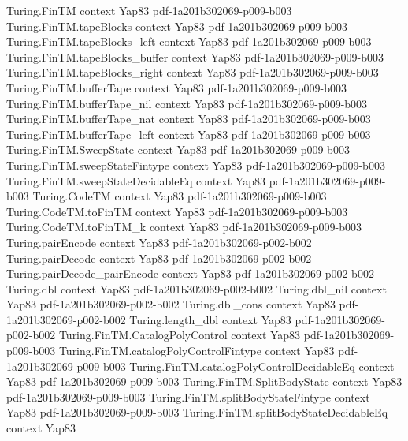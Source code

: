 \begin{theorem}
\proofstep
  {Turing.FinTM}
  {context}
  {Yap83}
  {pdf-1a201b302069-p009-b003}
\proofstep
  {Turing.FinTM.tapeBlocks}
  {context}
  {Yap83}
  {pdf-1a201b302069-p009-b003}
\proofstep
  {Turing.FinTM.tapeBlocks_left}
  {context}
  {Yap83}
  {pdf-1a201b302069-p009-b003}
\proofstep
  {Turing.FinTM.tapeBlocks_buffer}
  {context}
  {Yap83}
  {pdf-1a201b302069-p009-b003}
\proofstep
  {Turing.FinTM.tapeBlocks_right}
  {context}
  {Yap83}
  {pdf-1a201b302069-p009-b003}
\proofstep
  {Turing.FinTM.bufferTape}
  {context}
  {Yap83}
  {pdf-1a201b302069-p009-b003}
\proofstep
  {Turing.FinTM.bufferTape_nil}
  {context}
  {Yap83}
  {pdf-1a201b302069-p009-b003}
\proofstep
  {Turing.FinTM.bufferTape_nat}
  {context}
  {Yap83}
  {pdf-1a201b302069-p009-b003}
\proofstep
  {Turing.FinTM.bufferTape_left}
  {context}
  {Yap83}
  {pdf-1a201b302069-p009-b003}
\proofstep
  {Turing.FinTM.SweepState}
  {context}
  {Yap83}
  {pdf-1a201b302069-p009-b003}
\proofstep
  {Turing.FinTM.sweepStateFintype}
  {context}
  {Yap83}
  {pdf-1a201b302069-p009-b003}
\proofstep
  {Turing.FinTM.sweepStateDecidableEq}
  {context}
  {Yap83}
  {pdf-1a201b302069-p009-b003}
\proofstep
  {Turing.CodeTM}
  {context}
  {Yap83}
  {pdf-1a201b302069-p009-b003}
\proofstep
  {Turing.CodeTM.toFinTM}
  {context}
  {Yap83}
  {pdf-1a201b302069-p009-b003}
\proofstep
  {Turing.CodeTM.toFinTM_k}
  {context}
  {Yap83}
  {pdf-1a201b302069-p009-b003}
\proofstep
  {Turing.pairEncode}
  {context}
  {Yap83}
  {pdf-1a201b302069-p002-b002}
\proofstep
  {Turing.pairDecode}
  {context}
  {Yap83}
  {pdf-1a201b302069-p002-b002}
\proofstep
  {Turing.pairDecode_pairEncode}
  {context}
  {Yap83}
  {pdf-1a201b302069-p002-b002}
\proofstep
  {Turing.dbl}
  {context}
  {Yap83}
  {pdf-1a201b302069-p002-b002}
\proofstep
  {Turing.dbl_nil}
  {context}
  {Yap83}
  {pdf-1a201b302069-p002-b002}
\proofstep
  {Turing.dbl_cons}
  {context}
  {Yap83}
  {pdf-1a201b302069-p002-b002}
\proofstep
  {Turing.length_dbl}
  {context}
  {Yap83}
  {pdf-1a201b302069-p002-b002}
\proofstep
  {Turing.FinTM.CatalogPolyControl}
  {context}
  {Yap83}
  {pdf-1a201b302069-p009-b003}
\proofstep
  {Turing.FinTM.catalogPolyControlFintype}
  {context}
  {Yap83}
  {pdf-1a201b302069-p009-b003}
\proofstep
  {Turing.FinTM.catalogPolyControlDecidableEq}
  {context}
  {Yap83}
  {pdf-1a201b302069-p009-b003}
\proofstep
  {Turing.FinTM.SplitBodyState}
  {context}
  {Yap83}
  {pdf-1a201b302069-p009-b003}
\proofstep
  {Turing.FinTM.splitBodyStateFintype}
  {context}
  {Yap83}
  {pdf-1a201b302069-p009-b003}
\proofstep
  {Turing.FinTM.splitBodyStateDecidableEq}
  {context}
  {Yap83}

\end{theorem}
